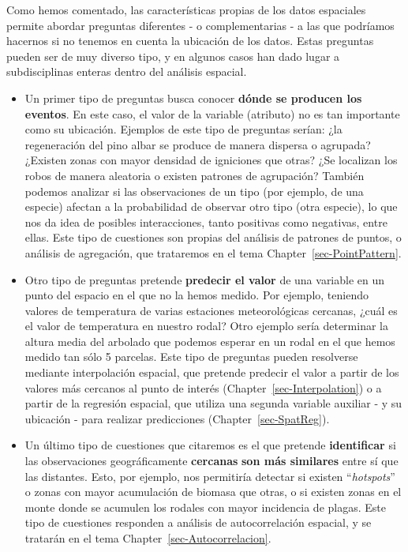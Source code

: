 \documentclass[
  letterpaper,
  DIV=11,
  numbers=noendperiod]{scrreprt}
\providecommand{\tightlist}{%
  \setlength{\itemsep}{0pt}\setlength{\parskip}{0pt}}\usepackage{longtable,booktabs,array}
\begin{document}

Como hemos comentado, las características propias de los datos
espaciales permite abordar preguntas diferentes - o complementarias - a
las que podríamos hacernos si no tenemos en cuenta la ubicación de los
datos. Estas preguntas pueden ser de muy diverso tipo, y en algunos
casos han dado lugar a subdisciplinas enteras dentro del análisis
espacial.

\begin{itemize}
\tightlist
\item
  Un primer tipo de preguntas busca conocer \textbf{dónde se producen
  los eventos}. En este caso, el valor de la variable (atributo) no es
  tan importante como su ubicación. Ejemplos de este tipo de preguntas
  serían: ¿la regeneración del pino albar se produce de manera dispersa
  o agrupada? ¿Existen zonas con mayor densidad de igniciones que otras?
  ¿Se localizan los robos de manera aleatoria o existen patrones de
  agrupación? También podemos analizar si las observaciones de un tipo
  (por ejemplo, de una especie) afectan a la probabilidad de observar
  otro tipo (otra especie), lo que nos da idea de posibles
  interacciones, tanto positivas como negativas, entre ellas. Este tipo
  de cuestiones son propias del análisis de patrones de puntos, o
  análisis de agregación, que trataremos en el tema
  Chapter~\ref{sec-PointPattern}.
\item
  Otro tipo de preguntas pretende \textbf{predecir el valor} de una
  variable en un punto del espacio en el que no la hemos medido. Por
  ejemplo, teniendo valores de temperatura de varias estaciones
  meteorológicas cercanas, ¿cuál es el valor de temperatura en nuestro
  rodal? Otro ejemplo sería determinar la altura media del arbolado que
  podemos esperar en un rodal en el que hemos medido tan sólo 5
  parcelas. Este tipo de preguntas pueden resolverse mediante
  interpolación espacial, que pretende predecir el valor a partir de los
  valores más cercanos al punto de interés
  (Chapter~\ref{sec-Interpolation}) o a partir de la regresión espacial,
  que utiliza una segunda variable auxiliar - y su ubicación - para
  realizar predicciones (Chapter~\ref{sec-SpatReg}).
\item
  Un último tipo de cuestiones que citaremos es el que pretende
  \textbf{identificar} si las observaciones geográficamente
  \textbf{cercanas} \textbf{son más similares} entre sí que las
  distantes. Esto, por ejemplo, nos permitiría detectar si existen
  ``\emph{hotspots}'' o zonas con mayor acumulación de biomasa que
  otras, o si existen zonas en el monte donde se acumulen los rodales
  con mayor incidencia de plagas. Este tipo de cuestiones responden a
  análisis de autocorrelación espacial, y se tratarán en el tema
  Chapter~\ref{sec-Autocorrelacion}.
\end{itemize}
\end{document}
